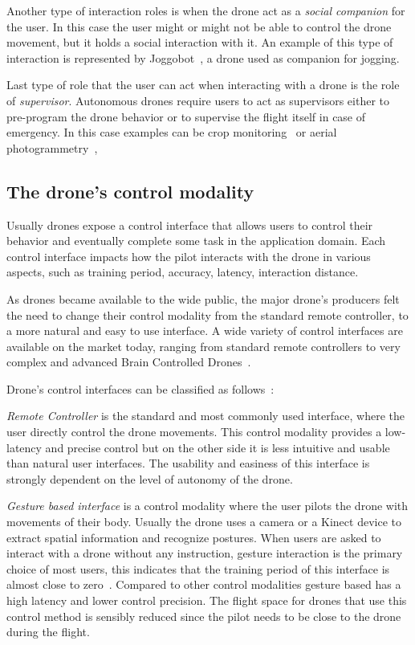 Another type of interaction roles is when the drone act as a \textit{social companion} for the user. 
In this case the user might or might not be able to control the drone movement, but it holds a social interaction with it.
An example of this type of interaction is represented by Joggobot~\cite{graether2012joggobot}, a drone used as companion for jogging.

Last type of role that the user can act when interacting with a drone is the role of \textit{supervisor}.
Autonomous drones require users to act as supervisors either to pre-program the drone behavior or to 
supervise the flight itself in case of emergency. In this case examples can be crop monitoring~\cite{dantu2011karma} or aerial photogrammetry~\cite{nex2014uav3Dmapping}, 

\subsection{The drone's control modality}\label{subsec:hdi_drone_control_mod}
Usually drones expose a control interface that allows users to control their behavior and eventually complete some task in the application domain.
Each control interface impacts how the pilot interacts with the drone in various aspects, 
such as training period, accuracy, latency, interaction distance.

As drones became available to the wide public, the major drone's producers felt the need to change their control modality 
from the standard remote controller, to a more natural and easy to use interface.
A wide variety of control interfaces are available on the market today, 
ranging from standard remote controllers to very complex and advanced Brain Controlled Drones~\cite{lafleur2013quadcopterBCI}.

Drone's control interfaces can be classified as follows~\cite{tezza2019hdi}:

\textit{Remote Controller} is the standard and most commonly used interface, where the user directly control the drone movements.
This control modality provides a low-latency and precise control but on the other side it is less intuitive and usable 
than natural user interfaces. The usability and easiness of this interface is strongly dependent on the level of autonomy of the drone.

\textit{Gesture based interface} is a control modality where the user pilots the drone with movements of their body.
Usually the drone uses a camera or a Kinect device to extract spatial information and recognize postures. 
When users are asked to interact with a drone without any instruction, gesture interaction is the primary choice of most users, 
this indicates that the training period of this interface is almost close to zero~\cite{cauchard2015droneAndMe}. 
Compared to other control modalities gesture based has a high latency and lower control precision. 
The flight space for drones that use this control method is sensibly reduced since the pilot needs to be close to the drone during the flight.

